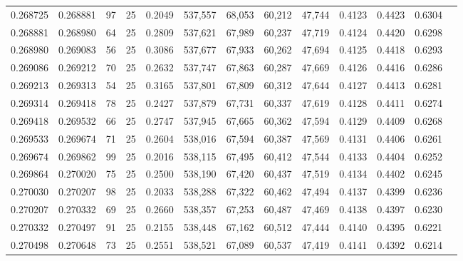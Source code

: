 \begin{tabular}{rrrrrrrrrrrrr}
0.268725 & 0.268881 &    97 &  25 &                                     0.2049 & 537,557 &  68,053 &  60,212 &  47,744 & 0.4123 & 0.4423 & 0.6304 \\
0.268881 & 0.268980 &    64 &  25 &                                     0.2809 & 537,621 &  67,989 &  60,237 &  47,719 & 0.4124 & 0.4420 & 0.6298 \\
0.268980 & 0.269083 &    56 &  25 &                                     0.3086 & 537,677 &  67,933 &  60,262 &  47,694 & 0.4125 & 0.4418 & 0.6293 \\
0.269086 & 0.269212 &    70 &  25 &                                     0.2632 & 537,747 &  67,863 &  60,287 &  47,669 & 0.4126 & 0.4416 & 0.6286 \\
0.269213 & 0.269313 &    54 &  25 &                                     0.3165 & 537,801 &  67,809 &  60,312 &  47,644 & 0.4127 & 0.4413 & 0.6281 \\
0.269314 & 0.269418 &    78 &  25 &                                     0.2427 & 537,879 &  67,731 &  60,337 &  47,619 & 0.4128 & 0.4411 & 0.6274 \\
0.269418 & 0.269532 &    66 &  25 &                                     0.2747 & 537,945 &  67,665 &  60,362 &  47,594 & 0.4129 & 0.4409 & 0.6268 \\
0.269533 & 0.269674 &    71 &  25 &                                     0.2604 & 538,016 &  67,594 &  60,387 &  47,569 & 0.4131 & 0.4406 & 0.6261 \\
0.269674 & 0.269862 &    99 &  25 &                                     0.2016 & 538,115 &  67,495 &  60,412 &  47,544 & 0.4133 & 0.4404 & 0.6252 \\
0.269864 & 0.270020 &    75 &  25 &                                     0.2500 & 538,190 &  67,420 &  60,437 &  47,519 & 0.4134 & 0.4402 & 0.6245 \\
0.270030 & 0.270207 &    98 &  25 &                                     0.2033 & 538,288 &  67,322 &  60,462 &  47,494 & 0.4137 & 0.4399 & 0.6236 \\
0.270207 & 0.270332 &    69 &  25 &                                     0.2660 & 538,357 &  67,253 &  60,487 &  47,469 & 0.4138 & 0.4397 & 0.6230 \\
0.270332 & 0.270497 &    91 &  25 &                                     0.2155 & 538,448 &  67,162 &  60,512 &  47,444 & 0.4140 & 0.4395 & 0.6221 \\
0.270498 & 0.270648 &    73 &  25 &                                     0.2551 & 538,521 &  67,089 &  60,537 &  47,419 & 0.4141 & 0.4392 & 0.6214 \\

\end{tabular}

